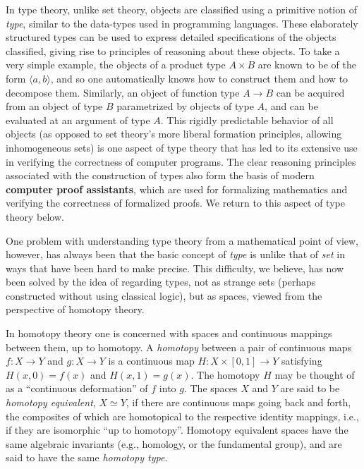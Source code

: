 In type theory, unlike set theory, objects are classified using a primitive notion of \emph{type}, similar to the data-types used in programming languages.  These elaborately structured types can be used to express detailed specifications of the objects classified, giving rise to principles of reasoning about these objects.  To take a very simple example, the objects of a product type $A\times B$ are known to be of the form $\langle a, b\rangle$, and so one automatically knows how to construct them and how to decompose them. Similarly, an object of function type $A\to B$ can be acquired from an object of type $B$ parametrized by objects of type $A$, and can be evaluated at an argument of type $A$.  This rigidly predictable behavior of all objects (as opposed to set theory's more liberal formation principles, allowing inhomogeneous sets) is one aspect of type theory that has led to its extensive use in verifying the correctness of computer programs.  The clear reasoning principles associated with the construction of types also form the basis of modern {\bf computer proof assistants}, which are used for formalizing mathematics and verifying the correctness of formalized proofs.  We return to this aspect of type theory below.  



One problem with understanding type theory from a mathematical point of view, however, has always been that the basic concept of \emph{type} is unlike that of \emph{set} in ways that have been hard to make precise. This difficulty, we believe, has now been solved by the idea of regarding types, not as strange sets (perhaps constructed without using classical logic), but as spaces, viewed from the perspective of homotopy theory.

In homotopy theory one is concerned with spaces and continuous mappings between them, 
up to homotopy.  A \emph{homotopy} between a pair of continuous maps $f \colon X \to Y$
and  $g \colon X\to Y$ is 
a continuous map $H \colon X \times [0, 1] \to Y$ satisfying
$H(x, 0) = f (x)$  and $H(x, 1) = g(x)$. The homotopy $H$ may be thought of as a ``continuous deformation'' of $f$ into $g$. The spaces $X$ and $Y$ are said to be \emph{homotopy equivalent}, $X\simeq Y$, if there are continuous maps going back and forth, the composites of which are homotopical to the respective identity mappings, i.e., if they are isomorphic ``up to homotopy''.  Homotopy equivalent spaces have the same algebraic invariants (e.g., homology, or the fundamental group), and are said to have the same \emph{homotopy type}.

